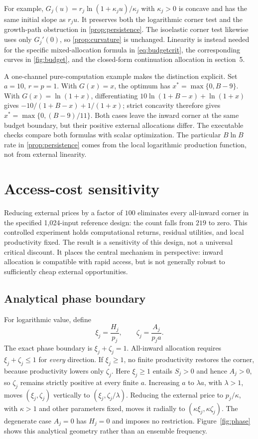 \documentclass[11pt,a4paper]{article}
\theoremstyle{definition}\newtheorem{definition}{Definition}
\begin{document}
For example, $G_j(u)=r_j\ln(1+\kappa_j u)/\kappa_j$ with
$\kappa_j>0$ is concave and has the same initial slope as $r_ju$.
It preserves both the logarithmic corner test and the growth-path
obstruction in \cref{prop:persistence}. The isoelastic corner test likewise
uses only $G_j'(0)$, so \cref{prop:curvature} is unchanged. Linearity is
instead needed for the specific mixed-allocation formula in
\cref{eq:budgetcrit}, the corresponding curves in \cref{fig:budget},
and the closed-form continuation allocation in section~5.

A one-channel pure-computation example makes the distinction explicit.
Set $a=10$, $r=p=1$. With $G(x)=x$, the optimum has
$x^*=\max\{0,B-9\}$. With $G(x)=\ln(1+x)$, differentiating
$10\ln(1+B-x)+\ln(1+x)$ gives
$-10/(1+B-x)+1/(1+x)$; strict concavity therefore gives
$x^*=\max\{0,(B-9)/11\}$. Both cases leave the inward corner at the
same budget boundary, but their positive external allocations differ.
The executable checks compare both formulas with scalar optimization.
The particular $B\ln B$ rate in \cref{prop:persistence} comes from the
local logarithmic production function, not from external linearity.

\section{Access-cost sensitivity}
\label{sec:access}
Reducing external prices by a factor of $100$ eliminates every all-inward
corner in the specified 1,024-input reference design: the count falls
from $219$ to zero. This controlled experiment holds computational
returns, residual utilities, and local productivity fixed. The result is
a sensitivity of this design, not a universal critical discount. It
places the central mechanism in perspective: inward allocation is
compatible with rapid access, but is not generally robust to sufficiently
cheap external opportunities.

\subsection{Analytical phase boundary}
For logarithmic value, define
\begin{equation}
 \xi_j=\frac{H_j}{p_j},\qquad
 \zeta_j=\frac{A_j}{p_ja}.
 \label{eq:phase-coordinates}
\end{equation}
The exact phase boundary is $\xi_j+\zeta_j=1$. All-inward allocation
requires $\xi_j+\zeta_j\leq1$ for \emph{every} direction.
If $\xi_j\geq1$, no finite productivity restores the corner, because
productivity lowers only $\zeta_j$. Here $\xi_j\geq1$ entails
$S_j>0$ and hence $A_j>0$, so $\zeta_j$ remains strictly positive
at every finite $a$. Increasing $a$ to $\lambda a$, with $\lambda>1$,
moves $(\xi_j,\zeta_j)$ vertically to $(\xi_j,\zeta_j/\lambda)$.
Reducing the external price to $p_j/\kappa$, with $\kappa>1$ and
other parameters fixed, moves it radially to
$(\kappa\xi_j,\kappa\zeta_j)$. The degenerate case $A_j=0$ has $H_j=0$ and imposes no
restriction. Figure~\ref{fig:phase} shows this analytical geometry rather
than an ensemble frequency.
\end{document}
